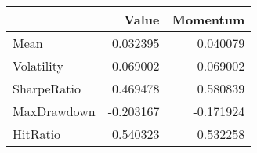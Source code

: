 \begin{tabular}{lrr}
\toprule
{} &     Value &  Momentum \\
\midrule
Mean        &  0.032395 &  0.040079 \\
Volatility  &  0.069002 &  0.069002 \\
SharpeRatio &  0.469478 &  0.580839 \\
MaxDrawdown & -0.203167 & -0.171924 \\
HitRatio    &  0.540323 &  0.532258 \\
\bottomrule
\end{tabular}
